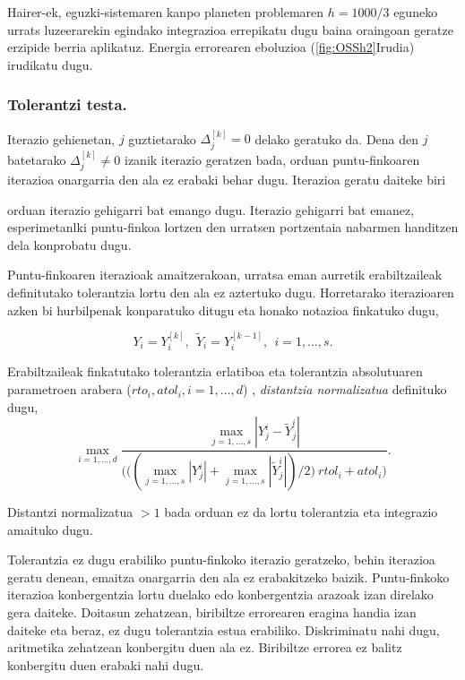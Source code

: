 Hairer-ek, eguzki-sistemaren kanpo planeten problemaren $h=1000/3$ eguneko urrats luzeerarekin egindako integrazioa errepikatu dugu baina oraingoan geratze erzipide berria aplikatuz. Energia errorearen eboluzioa (\ref{fig:OSSh2}Irudia) irudikatu dugu. 


\subsubsection*{Tolerantzi testa.}

Iterazio gehienetan, $j$ guztietarako $\Delta_{j}^{[k]}=0$ delako geratuko da. Dena den $j$ batetarako $\Delta_{j}^{[k]} \neq 0$ izanik iterazio geratzen bada, orduan puntu-finkoaren iterazioa onargarria den ala ez erabaki behar dugu. Iterazioa geratu daiteke biri


 orduan iterazio gehigarri bat emango dugu. Iterazio gehigarri bat emanez, esperimetanlki  puntu-finkoa lortzen den urratsen portzentaia nabarmen handitzen dela konprobatu dugu.


Puntu-finkoaren iterazioak amaitzerakoan, urratsa eman aurretik erabiltzaileak definitutako tolerantzia lortu den ala ez aztertuko dugu. Horretarako iterazioaren azken bi hurbilpenak konparatuko ditugu eta honako notazioa finkatuko dugu,

\begin{equation*}
Y_i=Y_i^{[k]}, \ \ \tilde{Y}_i=Y_i^{[k-1]}, \ \ i=1,\dots,s.
\end{equation*}  

Erabiltzaileak finkatutako tolerantzia erlatiboa eta tolerantzia absolutuaren parametroen arabera ($rto_i,atol_i, i=1,\dots,d$) , \emph{distantzia normalizatua} definituko dugu,
\begin{equation*}
\max_{i=1,\dots,d} \frac{\max_{j=1,\dots,s} |Y_j^i-\tilde{Y}_j^i|}
                        {\bigg(\big((\max_{j=1,\dots,s} |Y_j^i|+\max_{j=1,\dots,s} |\tilde{Y}_j^i|)/2 \big) \ rtol_i+ atol_i \bigg)}.
\end{equation*}

Distantzi normalizatua $>1$ bada orduan ez da lortu tolerantzia eta integrazio amaituko dugu.

Tolerantzia ez dugu erabiliko puntu-finkoko iterazio geratzeko, behin iterazioa geratu denean, emaitza onargarria den ala ez erabakitzeko baizik. Puntu-finkoko iterazioa konbergentzia lortu duelako edo konbergentzia arazoak izan direlako gera daiteke. Doitasun zehatzean, biribiltze errorearen eragina handia izan daiteke eta beraz, ez dugu tolerantzia estua erabiliko. Diskriminatu nahi dugu, aritmetika zehatzean konbergitu duen ala ez. Biribiltze errorea ez balitz konbergitu duen erabaki nahi dugu.

